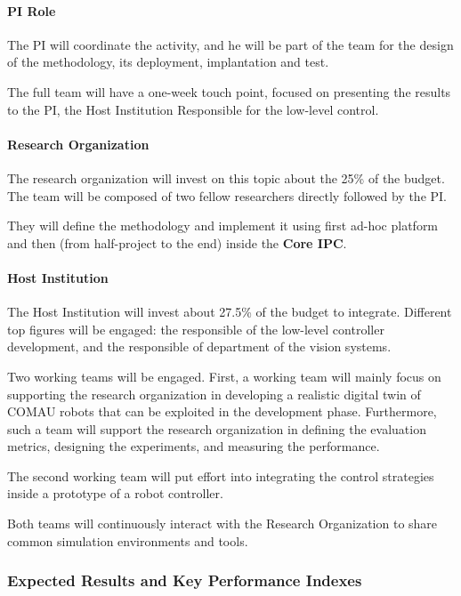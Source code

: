 \paragraph{PI Role}\label{pi-role-2}

The PI will coordinate the activity, and he will be part of the team for
the design of the methodology, its deployment, implantation and test.

The full team will have a one-week touch point, focused on presenting
the results to the PI, the Host Institution Responsible for the
low-level control.

\paragraph{Research Organization}\label{research-organization-2}

The research organization will invest on this topic about the 25\% of
the budget. The team will be composed of two fellow researchers directly
followed by the PI.

They will define the methodology and implement it using first ad-hoc
platform and then (from half-project to the end) inside the \textbf{Core
IPC}.

\paragraph{Host Institution}\label{host-institution-2}

The Host Institution will invest about 27.5\% of the budget to
integrate. Different top figures will be engaged: the responsible of the
low-level controller development, and the responsible of department of
the vision systems.

Two working teams will be engaged. First, a working team will mainly
focus on supporting the research organization in developing a realistic
digital twin of COMAU robots that can be exploited in the development
phase. Furthermore, such a team will support the research organization
in defining the evaluation metrics, designing the experiments, and
measuring the performance.

The second working team will put effort into integrating the control
strategies inside a prototype of a robot controller.

Both teams will continuously interact with the Research Organization to
share common simulation environments and tools.

\subsubsection{\texorpdfstring{Expected Results and Key Performance
Indexes
}{Expected Results and Key Performance Indexes }}\label{expected-results-and-key-performance-indexes-2}

